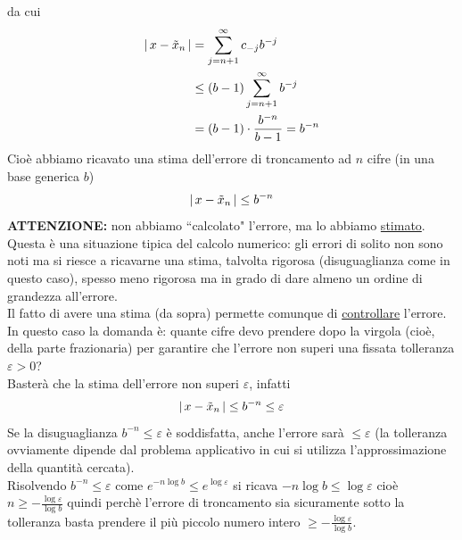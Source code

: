 \documentclass[12pt]{article}
\begin{document}
da cui
\[ \begin{split}
    \lvert \, x - \Tilde{x}_n \,\rvert & = \sum_{j=n+1}^\infty c_{-j} b^{-j} \\
    & \le (b-1)\sum_{j=n+1}^{\infty} b^{-j} \\
    & = (b-1) \cdot \frac{b^{-n}}{b - 1} = b^{-n}
\end{split}\]
Cioè abbiamo ricavato una stima dell'errore di troncamento ad $n$ cifre (in una base generica $b$) \[ \lvert \, x - \Tilde{x}_n \,\rvert \le b^{-n} \]
\textbf{ATTENZIONE:} non abbiamo ``calcolato" l'errore, ma lo abbiamo \uline{stimato}. \\
Questa è una situazione tipica del calcolo numerico: gli errori di solito non sono noti ma si riesce a ricavarne una stima, talvolta rigorosa (disuguaglianza come in questo caso), spesso meno rigorosa ma in grado di dare almeno un ordine di grandezza all'errore. \\
Il fatto di avere una stima (da sopra) permette comunque di \uline{controllare} l'errore. \\
In questo caso la domanda è: quante cifre devo prendere dopo la virgola (cioè, della parte frazionaria) per garantire che l'errore non superi una fissata tolleranza $\varepsilon > 0$? \\
Basterà che la stima dell'errore non superi $\varepsilon$, infatti
\[ \lvert \, x - \Tilde{x}_n \,\rvert \le b^{-n} \le \varepsilon\]
Se la disuguaglianza $b^{-n} \le \varepsilon$ è soddisfatta, anche l'errore sarà $\le \varepsilon$ (la tolleranza ovviamente dipende dal problema applicativo in cui si utilizza l'approssimazione della quantità cercata).\\
Risolvendo $b^{-n} \le \varepsilon$ come $e^{-n \log b} \le e^{\log \varepsilon}$ si ricava $-n \log b \le \log \varepsilon$ cioè $n \ge - \frac{\log \varepsilon}{\log b}$ quindi perchè l'errore di troncamento sia sicuramente sotto la tolleranza basta prendere il più piccolo numero intero $\ge - \frac{\log \varepsilon}{\log b}$.
\end{document}
